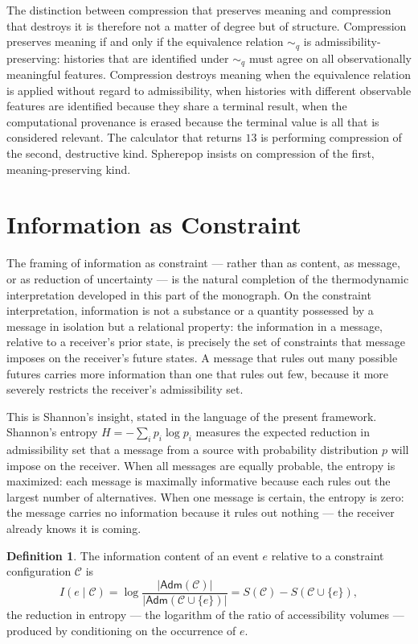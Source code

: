 \documentclass[12pt,openany]{book}
\theoremstyle{plain}
\theoremstyle{definition}
\newtheorem{definition}[theorem]{Definition}
\theoremstyle{remark}
\newcommand{\sadm}{\mathsf{Adm}}
\begin{document}
The distinction between compression that preserves meaning and compression that destroys it is therefore not a matter of degree but of structure. Compression preserves meaning if and only if the equivalence relation $\sim_q$ is admissibility-preserving: histories that are identified under $\sim_q$ must agree on all observationally meaningful features. Compression destroys meaning when the equivalence relation is applied without regard to admissibility, when histories with different observable features are identified because they share a terminal result, when the computational provenance is erased because the terminal value is all that is considered relevant. The calculator that returns $13$ is performing compression of the second, destructive kind. Spherepop insists on compression of the first, meaning-preserving kind.

\section{Information as Constraint}

The framing of information as constraint — rather than as content, as message, or as reduction of uncertainty — is the natural completion of the thermodynamic interpretation developed in this part of the monograph. On the constraint interpretation, information is not a substance or a quantity possessed by a message in isolation but a relational property: the information in a message, relative to a receiver's prior state, is precisely the set of constraints that message imposes on the receiver's future states. A message that rules out many possible futures carries more information than one that rules out few, because it more severely restricts the receiver's admissibility set.

This is Shannon's insight, stated in the language of the present framework. Shannon's entropy $H = -\sum_i p_i \log p_i$ measures the expected reduction in admissibility set that a message from a source with probability distribution $p$ will impose on the receiver. When all messages are equally probable, the entropy is maximized: each message is maximally informative because each rules out the largest number of alternatives. When one message is certain, the entropy is zero: the message carries no information because it rules out nothing — the receiver already knows it is coming.

\begin{definition}
The information content of an event $e$ relative to a constraint configuration $\mathcal{C}$ is
\[
  I(e \mid \mathcal{C}) = \log \frac{\lvert \sadm(\mathcal{C}) \rvert}{\lvert \sadm(\mathcal{C} \cup \{e\}) \rvert}
                        = S(\mathcal{C}) - S(\mathcal{C} \cup \{e\}),
\]
the reduction in entropy — the logarithm of the ratio of accessibility volumes — produced by conditioning on the occurrence of $e$.
\end{definition}
\end{document}
